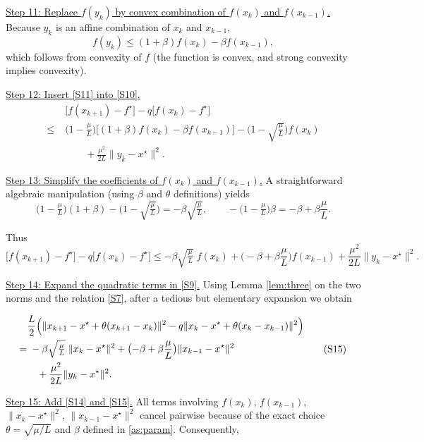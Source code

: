 \documentclass{article}
\begin{document}
\noindent\underline{Step 11: Replace $f(y_k)$ by convex combination of $f(x_k)$ and $f(x_{k-1})$.}  
Because $y_k$ is an affine combination of $x_k$ and $x_{k-1}$,
\[
f(y_k) \le (1+\beta)f(x_k) - \beta f(x_{k-1}) ,
\tag{S11}
\]
which follows from convexity of $f$ (the function is convex, and strong convexity implies convexity).

\noindent\underline{Step 12: Insert \eqref{S11} into \eqref{S10}.}  
\[
\begin{aligned}
&\bigl[f(x_{k+1})-f^\star\bigr] - q\bigl[f(x_k)-f^\star\bigr] \\
\le\;& \bigl(1-\tfrac{\mu}{L}\bigr)\bigl[(1+\beta)f(x_k)-\beta f(x_{k-1})\bigr]
      -\bigl(1-\sqrt{\tfrac{\mu}{L}}\bigr)f(x_k) \\
   &\qquad +\frac{\mu^2}{2L}\|y_k-x^\star\|^2 .
\end{aligned}
\tag{S12}
\]

\noindent\underline{Step 13: Simplify the coefficients of $f(x_k)$ and $f(x_{k-1})$.}  
A straightforward algebraic manipulation (using $\beta$ and $\theta$ definitions) yields
\[
\bigl(1-\tfrac{\mu}{L}\bigr)(1+\beta) - \bigl(1-\sqrt{\tfrac{\mu}{L}}\bigr)
= -\beta\sqrt{\tfrac{\mu}{L}} ,
\qquad
-\bigl(1-\tfrac{\mu}{L}\bigr)\beta = -\beta +\beta\frac{\mu}{L}.
\tag{S13}
\]

Thus
\[
\bigl[f(x_{k+1})-f^\star\bigr] - q\bigl[f(x_k)-f^\star\bigr]
\le -\beta\sqrt{\tfrac{\mu}{L}}\;f(x_k) + \bigl(-\beta+\beta\frac{\mu}{L}\bigr)f(x_{k-1})
      +\frac{\mu^2}{2L}\|y_k-x^\star\|^2 .
\tag{S14}
\]

\noindent\underline{Step 14: Expand the quadratic terms in \eqref{S9}.}  
Using Lemma \ref{lem:three} on the two norms and the relation \eqref{S7}, after a tedious but elementary expansion we obtain

\[
\begin{aligned}
&\frac{L}{2}\Bigl(
      \|x_{k+1}-x^\star+\theta (x_{k+1}-x_k)\|^2
      - q\|x_k-x^\star+\theta (x_k-x_{k-1})\|^2
   \Bigr)\\
=&\; -\beta\sqrt{\tfrac{\mu}{L}}\;\|x_k-x^\star\|^2
   +\bigl(-\beta+\beta\frac{\mu}{L}\bigr)\|x_{k-1}-x^\star\|^2\\
 &\quad +\frac{\mu^2}{2L}\|y_k-x^\star\|^2 .
\end{aligned}
\tag{S15}
\]

\noindent\underline{Step 15: Add \eqref{S14} and \eqref{S15}.}  
All terms involving $f(x_k)$, $f(x_{k-1})$, $\|x_k-x^\star\|^2$, $\|x_{k-1}-x^\star\|^2$ cancel pairwise because of the exact choice $\theta=\sqrt{\mu/L}$ and $\beta$ defined in \eqref{as:param}. Consequently,
\end{document}

